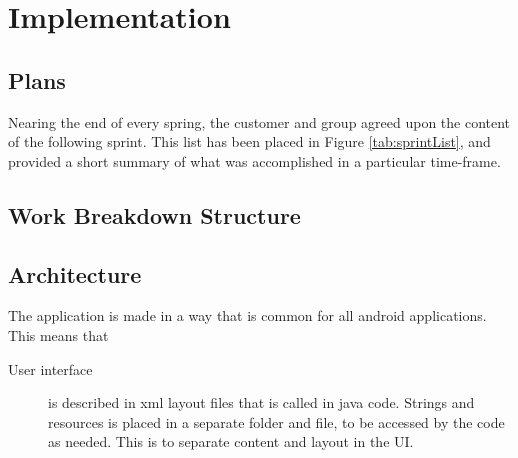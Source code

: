 \chapter{Implementation}
\section{Plans}

Nearing the end of every spring, the customer and group agreed upon the content of the following sprint. This list has been placed in Figure \ref{tab:sprintList}, and provided a short summary of what was accomplished in a particular time-frame. 

\section{Work Breakdown Structure}



\section{Architecture}
The application is made in a way that is common for all android applications. This means that
\begin{description}
\item[User interface] is described in xml layout files that is called in java code. Strings and resources is placed in a separate folder and file, to be accessed by the code as needed. This is to separate content and layout in the UI.
\end{description}





 





